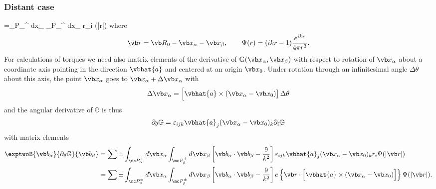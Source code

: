 \documentclass[letterpaper]{article}
\begin{document}
\subsubsection*{Distant case}
{
 =\sum \pm \int_{\mc P_\alpha^\pm } d\vb x_\alpha
           \int_{\mc P_\beta^\pm  } d\vb x_\beta
           r_i \Psi(|\vb r|)
}
where
$$ \vb r = \vb R_0 - \vb x_\alpha - \vb x_\beta, \qquad
   \Psi(r) = (ikr-1)\frac{e^{ikr}}{4\pi r^3}.
$$
For calculations of torques we need also matrix elements
of the derivative of $\mathbb{G}(\vb x_\alpha, \vb x_\beta)$ with respect
to rotation of $\vb x_\alpha$ about a coordinate axis pointing in the
direction $\vbhat{a}$ and centered at an origin $\vb x_0$.
Under rotation through an infinitesimal angle $\Delta \theta$
about this axis, the point $\vb x_\alpha$ goes to 
$\vb x_\alpha + \Delta \vb x_\alpha$ with 
$$\Delta \vb x_\alpha 
  = 
  \Big[\vbhat{a}\times (\vb x_\alpha-\vb x_0)\big] \, \Delta \theta
$$
and the angular derivative of $\mathbb{G}$ is thus
$$
 \partial_\theta\mathbb{G}
 =
 \varepsilon_{ijk} \vbhat{a}_j (\vb x_\alpha - \vb x_0)_k \partial_i \mathbb{G}
$$
with matrix elements
\begin{align*}
 \exptwoB{\vb b_\alpha}{\partial_\theta \mathbb G}{\vb b_\beta}
&=\sum \pm \int_{\mc P_\alpha^\pm } d\vb x_\alpha
           \int_{\mc P_\beta^\pm  } d\vb x_\beta
           \left[ \vb b_\alpha \cdot \vb b_\beta
                 -\frac{9}{k^2}
           \right]
           \varepsilon_{ijk} \vbhat{a}_j(\vb x_\alpha - \vb x_0)_k
           r_i \Psi(|\vb r|)
\\
&=\sum \pm \int_{\mc P_\alpha^\pm } d\vb x_\alpha
           \int_{\mc P_\beta^\pm  } d\vb x_\beta
           \left[ \vb b_\alpha \cdot \vb b_\beta
                 -\frac{9}{k^2}
           \right]
 e         \left\{ \vb r \cdot \Big[\vbhat{a} \times (\vb x_\alpha-\vb x_0)\Big]\right\}
           \Psi(|\vb r|).
\label{bdtGb}
\end{align*}
\end{document}
